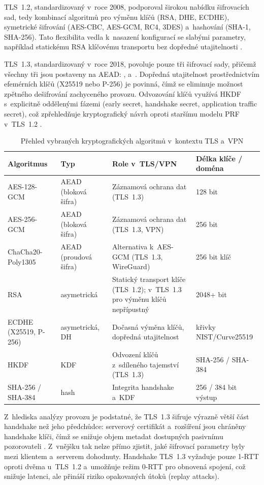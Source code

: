 TLS~1.2, standardizovaný v~roce 2008, podporoval širokou nabídku šifrovacích sad, tedy kombinací algoritmů pro výměnu klíčů (RSA, DHE, ECDHE), symetrické šifrování (AES-CBC, AES-GCM, RC4, 3DES) a~hashování (SHA-1, SHA-256). Tato flexibilita vedla k~nasazení konfigurací se slabými parametry, například statickému RSA klíčovému transportu bez dopředné utajitelnosti \parencite{Keshkeh2021}.

TLS~1.3, standardizovaný v~roce 2018, povoluje pouze tři šifrovací sady, přičemž všechny tři jsou postaveny na AEAD: ,  a~. Dopředná utajitelnost prostřednictvím efemérních klíčů (X25519 nebo P-256) je povinná, čímž se eliminuje možnost zpětného dešifrování zachyceného provozu. Odvozování klíčů využívá HKDF s~explicitně oddělenými fázemi (early secret, handshake secret, application traffic secret), což zpřehledňuje kryptografický návrh oproti staršímu modelu PRF v~TLS~1.2 \parencite{Keshkeh2021}.

\begin{table}[htbp]
\centering
\caption{Přehled vybraných kryptografických algoritmů v~kontextu TLS a~VPN}
\label{tab:krypto-algoritmy}
\small
\begin{tabular}{p{2.85cm}p{3.05cm}p{4.85cm}p{2.75cm}}
\toprule
Algoritmus & Typ & Role v~TLS/VPN & Délka klíče / doména \\
\midrule
AES-128-GCM & AEAD (bloková šifra) & Záznamová ochrana dat (TLS~1.3) & 128 bit \\
AES-256-GCM & AEAD (bloková šifra) & Záznamová ochrana dat (TLS~1.3, VPN) & 256 bit \\
ChaCha20-Poly1305 & AEAD (proudová šifra) & Alternativa k~AES-GCM (TLS~1.3, WireGuard) & 256 bit klíč \\
RSA & asymetrická & Statický transport klíče (TLS~1.2); v~TLS~1.3 pro výměnu klíčů nepřípustný & 2048+ bit \\
ECDHE (X25519, P-256) & asymetrická, DH & Dočasná výměna klíčů, dopředná utajitelnost & křivky NIST/Curve25519 \\
HKDF & KDF & Odvození klíčů z~sdíleného tajemství (TLS~1.3) & SHA-256 / SHA-384 \\
SHA-256 / SHA-384 & hash & Integrita handshake a~KDF & 256 / 384 bit výstup \\
\bottomrule
\end{tabular}
\end{table}
Z~hlediska analýzy provozu je podstatné, že TLS~1.3 šifruje výrazně větší část handshake než jeho předchůdce: serverový certifikát a~rozšíření jsou chráněny handshake klíči, čímž se snižuje objem metadat dostupných pasivnímu pozorovateli \parencite{Ji2024}. Z~vnějšku tak nelze přímo zjistit, jaké šifrovací parametry byly mezi klientem a~serverem dohodnuty. Handshake TLS~1.3 vyžaduje pouze 1-RTT oproti dvěma u~TLS~1.2 a~umožňuje režim 0-RTT pro obnovená spojení, což snižuje latenci, ale přináší riziko opakovaných útoků (replay attacks).

